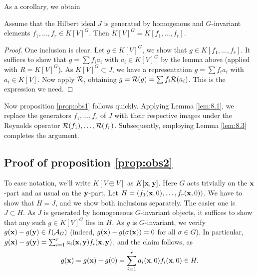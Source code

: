 \documentclass[../main.tex]{subfiles}
\begin{document}
As a corollary, we obtain
\begin{lem}\label{lem:8.3}
    Assume that the Hilbert ideal $J$ is generated by homogenous and
    $G$-invariant elements $f_1, \dots, \allowbreak f_r \in K[V]^G$. Then
    $K[V]^G = K[f_1, \dots, f_r]$. 
\begin{proof}
    One inclusion is clear. Let $g \in K[V]^G$, we show that $g \in K[f_1, \dots, f_r]$.
    It suffices to show that $g = \sum f_i a_i$ with $a_i \in K[V]^G$
    by the lemma above (applied with $R = K[V]^G$). As $K[V]^G \subset J$, we
    have a representation $g = \sum f_i a_i$ with $a_i \in K[V]$. Now apply
    $\mathcal{R}$, obtaining $g = \mathcal{R}(g) = \sum f_i \mathcal{R}(a_i)$. This is the expression
    we need.
\end{proof}
\end{lem}

Now proposition \ref{prop:obs1} follows quickly. 
Applying Lemma \ref{lem:8.1}, we replace the generators $f_1, \dots, f_r$ of
$J$ with their respective images under the Reynolds operator $\mathcal{R}(f_1), \dots,
\mathcal{R}(f_r)$. Subsequently, employing Lemma \ref{lem:8.3} completes the argument.

\subsection{Proof of proposition \ref{prop:obs2}} %
\label{sub:Proof of proposition 9}
To ease notation, we'll write $K[V \oplus V]$ as $K[\mathbf{x},\mathbf{y}]$. Here $G$ acts trivially
on the $\mathbf{x}$-part and as usual on the $\mathbf{y}$-part.
Let $H = (f_1(\mathbf{x}, 0), \dots, f_r(\mathbf{x},0))$. We have to show that $H = J$, and
we show both inclusions separately. The easier one is $J \subset H$. 
As $J$ is generated by homogeneous $G$-invariant objects, it suffices to show that any
such $g \in K[V]^G$ lies in $H$. As $g$ is $G$-invariant, we verify $g(\mathbf{x})-g(\mathbf{y}) \in
I(\mathcal{A}_G)$ (indeed, $g(\mathbf{x})-g(\sigma(\mathbf{x})) = 0$ for all $\sigma \in G$). In particular, $g(\mathbf{x}) - g(\mathbf{y}) = \sum_{i=1}^r a_i(\mathbf{x},\mathbf{y}) f_i(\mathbf{x},\mathbf{y})$,
and the claim follows, as
\begin{equation*}
    g(\mathbf{x}) = g(\mathbf{x}) - g(0) = \sum_{i=1}^r a_i(\mathbf{x},0) f_i(\mathbf{x},0) \in H.
\end{equation*}
\end{document}
